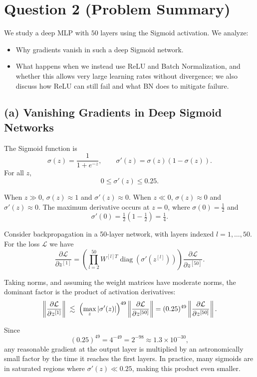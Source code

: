 \documentclass{article}
\begin{document}
\section{Question 2 (Problem Summary)}
	We study a deep MLP with $50$ layers using the Sigmoid activation.
We analyze:
\begin{itemize}
	\item[(a)] Why gradients vanish in such a deep Sigmoid network.
	\item[(b)] What happens when we instead use ReLU and Batch Normalization, and whether this allows very large learning rates without divergence; we also discuss how ReLU can still fail and what BN does to mitigate failure.
\end{itemize}

\subsection{(a) Vanishing Gradients in Deep Sigmoid Networks}

The Sigmoid function is
\[
\sigma(z)=\frac{1}{1+e^{-z}},
\qquad
\sigma'(z)=\sigma(z)(1-\sigma(z)).
\]
For all $z$,
\[
0 \le \sigma'(z)\le 0.25.
\]

When $z\gg 0$, $\sigma(z)\approx 1$ and $\sigma'(z)\approx 0$.
When $z\ll 0$, $\sigma(z)\approx 0$ and $\sigma'(z)\approx 0$.
The maximum derivative occurs at $z=0$, where $\sigma(0)=\tfrac12$ and
\[
\sigma'(0) = \tfrac12(1-\tfrac12)=\tfrac14.
\]

Consider backpropagation in a 50-layer network, with layers indexed
$l=1,\dots,50$.
For the loss $\mathcal{L}$ we have
\[
\frac{\partial\mathcal{L}}{\partial z^{[1]}}
=
\left(
\prod_{l=2}^{50}
W^{[l]T}
\operatorname{diag}(\sigma'(z^{[l]}))
\right)
\frac{\partial\mathcal{L}}{\partial z^{[50]}}.
\]

Taking norms, and assuming the weight matrices have moderate norms,
the dominant factor is the product of activation derivatives:
\[
\left\|
\frac{\partial\mathcal{L}}{\partial z^{[1]}}
\right\|
\;\lesssim\;
\Bigl(\max_z |\sigma'(z)|\Bigr)^{49}
\left\|
\frac{\partial\mathcal{L}}{\partial z^{[50]}}
\right\|
=
(0.25)^{49}
\left\|
\frac{\partial\mathcal{L}}{\partial z^{[50]}}
\right\|.
\]

Since
\[
(0.25)^{49} = 4^{-49} = 2^{-98} \approx 1.3\times 10^{-30},
\]
any reasonable gradient at the output layer is multiplied by an
astronomically small factor by the time it reaches the first layers.
In practice, many sigmoids are in saturated regions where
$\sigma'(z)\ll 0.25$, making this product even smaller.
\end{document}
